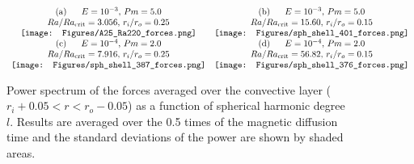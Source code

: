 \begin{figure*}
\begin{center}
\[
\begin{array}{cc}
 {\rm (a)}~~~~~ \mbox{$E = 10^{-3}$, $Pm = 5.0$} &
 {\rm (b)}~~~~~ \mbox{$E = 10^{-3}$, $Pm = 5.0$} \\
 \mbox{$Ra / Ra_{\rm crit} = 3.056$, $r_{i} / r_{o} = 0.25$} &
 \mbox{$Ra / Ra_{\rm crit} = 15.60$, $r_{i} / r_{o} = 0.15$} \\
\texttt{[image: Figures/A25\_Ra220\_forces.png]} &
 \texttt{[image: Figures/sph\_shell\_401\_forces.png]} \\
 {\rm (c)}~~~~~ \mbox{$E = 10^{-4}$, $Pm = 2.0$} &
 {\rm (d)}~~~~~ \mbox{$E = 10^{-4}$, $Pm = 2.0$} \\
 \mbox{$Ra / Ra_{\rm crit} = 7.916$, $r_{i} / r_{o} = 0.25$} &
 \mbox{$Ra / Ra_{\rm crit} = 56.82$, $r_{i} / r_{o} = 0.15$} \\
 \texttt{[image: Figures/sph\_shell\_387\_forces.png]} &
 \texttt{[image: Figures/sph\_shell\_376\_forces.png]}
\end{array}
\]
\end{center}
\caption{Power spectrum of the forces averaged over the  convective layer ($r_{i}+0.05 < r < r_{o} - 0.05$) as a function of spherical harmonic degree $l$. Results are averaged over the 0.5 times of the magnetic diffusion time and the standard deviations of the power are shown by shaded areas.}
\label{fig:force_balance_spectr}
\end{figure*}